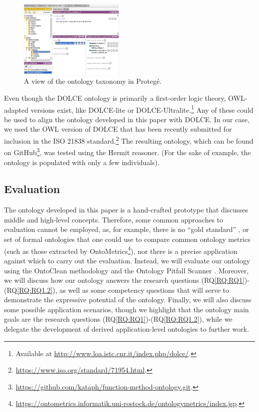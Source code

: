 \documentclass[sw]{iosart2x}
\newcommand{\RQLabel}{\textrm{RQ}}
\newcommand{\refRQ}[1]{({\RQLabel}\ref{#1})}
\newcommand{\DOLCE}{\textsc{DOLCE}\xspace} %
\newcommand{\OWL}{\textnormal{OWL}\xspace}
\newcommand{\qquotes}[1]{``#1''}
\begin{document}
\begin{figure}
  \centering
  \includegraphics[width=0.45\textwidth]{entities_screenshot.PNG}
  \caption{A view of the ontology taxonomy in Protegé.\label{fig:screen_entities}}
\end{figure}

Even though the \DOLCE ontology is primarily a first-order logic theory, \OWL-adapted versions exist, like \DOLCE-lite or \DOLCE-Ultralite.\footnote{Available at \url{http://www.loa.istc.cnr.it/index.php/dolce/}.}
Any of these could be used to align the ontology developed in this paper with \DOLCE. In our case, we used the \OWL version of \DOLCE that has been recently submitted for inclusion in the ISO 21838 standard.\footnote{\url{https://www.iso.org/standard/71954.html}.} The resulting ontology, which can be found on GitHub\footnote{\url{https://github.com/kataph/function-method-ontology.git}.}, was tested using the Hermit reasoner.
(For the sake of example, the ontology is populated with only a few individuals).

\subsection{Evaluation}
The ontology developed in this paper is a hand-crafted prototype that discusses middle and high-level concepts. 
Therefore, some common approaches to evaluation cannot be employed, as, for example, there is no \qquotes{gold standard} \cite{sfarGoldStandardBased2016}, or set of formal ontologies that one could use to compare common ontology metrics (such as those extracted by OntoMetrics\footnote{\url{https://ontometrics.informatik.uni-rostock.de/ontologymetrics/index.jsp}.}), nor there is a precise application against which to carry out the evaluation. 
Instead, we will evaluate our ontology using the OntoClean methodology  \cite{guarinoOverviewOntoClean2009} and the Ontology Pitfall Scanner \cite{poveda2014oops}. 
Moreover, we will discuss how our ontology answers the research questions \refRQ{RQ:RQ1}-\refRQ{RQ:RQ1.2}, as well as some competency questions that will serve to demonstrate the expressive potential of the ontology.
Finally, we will also discuss some possible application scenarios, though we highlight that the ontology main goals are the research questions \refRQ{RQ:RQ1}-\refRQ{RQ:RQ1.2}, while we delegate the development of derived application-level ontologies to further work.
\end{document}
